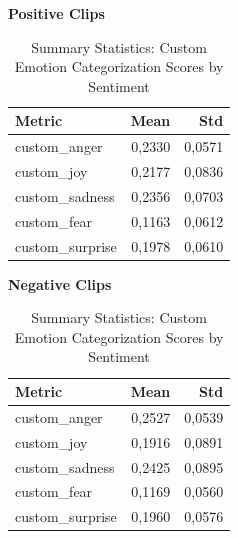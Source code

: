   \begin{table}[H]
    \centering
    \begin{subtable}{0.45\textwidth}
      \centering
      \caption*{\textbf{Positive Clips}}
      \begin{tabular}{lrr}
        \toprule
        \textbf{Metric}      & \textbf{Mean}  & \textbf{Std}   \\
        \midrule
        custom\_anger    & 0,2330 & 0,0571 \\
        custom\_joy      & 0,2177 & 0,0836 \\
        custom\_sadness  & 0,2356 & 0,0703 \\
        custom\_fear     & 0,1163 & 0,0612 \\
        custom\_surprise & 0,1978 & 0,0610 \\
        \bottomrule
      \end{tabular}
    \end{subtable}\hfill
    \begin{subtable}{0.45\textwidth}
      \centering
      \caption*{\textbf{Negative Clips}}
      \begin{tabular}{lrr}
        \toprule
        \textbf{Metric}      & \textbf{Mean}  & \textbf{Std}   \\
        \midrule
        custom\_anger    & 0,2527 & 0,0539 \\
        custom\_joy      & 0,1916 & 0,0891 \\
        custom\_sadness  & 0,2425 & 0,0895 \\
        custom\_fear     & 0,1169 & 0,0560 \\
        custom\_surprise & 0,1960 & 0,0576 \\
        \bottomrule
      \end{tabular}
    \end{subtable}
    \caption{Summary Statistics: Custom Emotion Categorization Scores by Sentiment}
    \label{tab:summary_praat_by_sentiment}
  \end{table}
  
  
  

